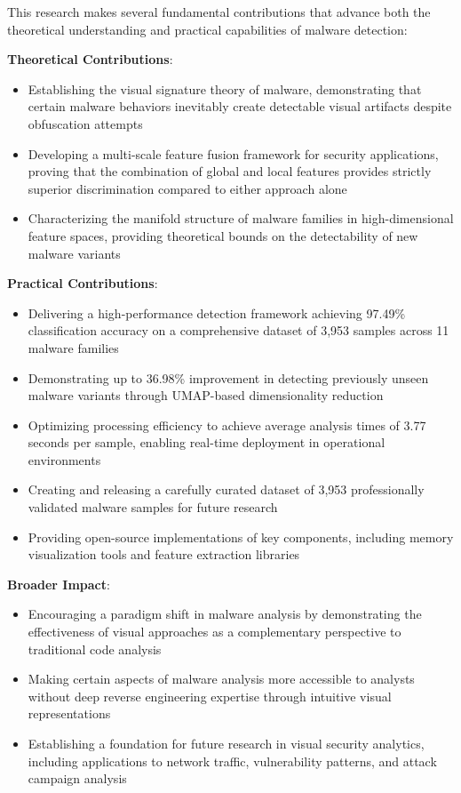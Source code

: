 This research makes several fundamental contributions that advance both the theoretical understanding and practical capabilities of malware detection:

\textbf{Theoretical Contributions}:
\begin{itemize}
    \item Establishing the visual signature theory of malware, demonstrating that certain malware behaviors inevitably create detectable visual artifacts despite obfuscation attempts
    
    \item Developing a multi-scale feature fusion framework for security applications, proving that the combination of global and local features provides strictly superior discrimination compared to either approach alone
    
    \item Characterizing the manifold structure of malware families in high-dimensional feature spaces, providing theoretical bounds on the detectability of new malware variants
\end{itemize}

\textbf{Practical Contributions}:
\begin{itemize}
    \item Delivering a high-performance detection framework achieving 97.49\% classification accuracy on a comprehensive dataset of 3,953 samples across 11 malware families
    
    \item Demonstrating up to 36.98\% improvement in detecting previously unseen malware variants through UMAP-based dimensionality reduction
    
    \item Optimizing processing efficiency to achieve average analysis times of 3.77 seconds per sample, enabling real-time deployment in operational environments
    
    \item Creating and releasing a carefully curated dataset of 3,953 professionally validated malware samples for future research
    
    \item Providing open-source implementations of key components, including memory visualization tools and feature extraction libraries
\end{itemize}

\textbf{Broader Impact}:
\begin{itemize}
    \item Encouraging a paradigm shift in malware analysis by demonstrating the effectiveness of visual approaches as a complementary perspective to traditional code analysis
    
    \item Making certain aspects of malware analysis more accessible to analysts without deep reverse engineering expertise through intuitive visual representations
    
    \item Establishing a foundation for future research in visual security analytics, including applications to network traffic, vulnerability patterns, and attack campaign analysis
\end{itemize}

